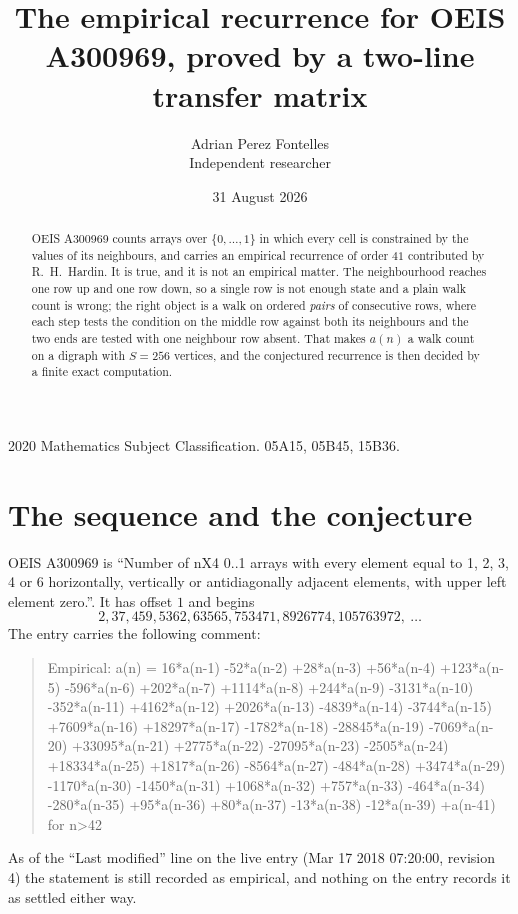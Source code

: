 \documentclass[11pt,a4paper]{article}
\title{The empirical recurrence for OEIS A300969, proved by a two-line transfer matrix}
\author{Adrian Perez Fontelles\\ \small Independent researcher}
\date{31 August 2026}
\theoremstyle{plain}
\theoremstyle{definition}
\begin{document}
\maketitle

\begin{abstract}
OEIS A300969 counts arrays over $\{0,\dots,1\}$ in which every cell is constrained by the
values of its neighbours, and carries an empirical recurrence of order $41$ contributed
by R.~H.~Hardin. It is true, and it is not an empirical matter. The neighbourhood reaches one
row up and one row down, so a single row is not enough state and a plain walk count
is wrong; the right object is a walk on ordered \emph{pairs} of consecutive rows, where
each step tests the condition on the middle row against both its neighbours and the two
ends are tested with one neighbour row absent. That makes $a(n)$ a walk count on a digraph
with $S=256$ vertices, and the conjectured recurrence is then decided by a finite exact
computation.
\end{abstract}

\noindent\small 2020 Mathematics Subject Classification. 05A15, 05B45, 15B36.\normalsize

\section{The sequence and the conjecture}

OEIS A300969 is ``Number of nX4 0..1 arrays with every element equal to 1, 2, 3, 4 or 6 horizontally, vertically or antidiagonally adjacent elements, with upper left element zero.''. It has offset $1$ and begins
\[
2, 37, 459, 5362, 63565, 753471, 8926774, 105763972,\ \dots
\]
The entry carries the following comment:
\begin{quote}\small
Empirical: a(n) = 16*a(n-1) -52*a(n-2) +28*a(n-3) +56*a(n-4) +123*a(n-5) -596*a(n-6) +202*a(n-7) +1114*a(n-8) +244*a(n-9) -3131*a(n-10) -352*a(n-11) +4162*a(n-12) +2026*a(n-13) -4839*a(n-14) -3744*a(n-15) +7609*a(n-16) +18297*a(n-17) -1782*a(n-18) -28845*a(n-19) -7069*a(n-20) +33095*a(n-21) +2775*a(n-22) -27095*a(n-23) -2505*a(n-24) +18334*a(n-25) +1817*a(n-26) -8564*a(n-27) -484*a(n-28) +3474*a(n-29) -1170*a(n-30) -1450*a(n-31) +1068*a(n-32) +757*a(n-33) -464*a(n-34) -280*a(n-35) +95*a(n-36) +80*a(n-37) -13*a(n-38) -12*a(n-39) +a(n-41) for n>42
\end{quote}
As of the ``Last modified'' line on the live entry (Mar 17 2018 07:20:00, revision 4) the statement is
still recorded as empirical, and nothing on the entry records it as settled either way.
\end{document}
